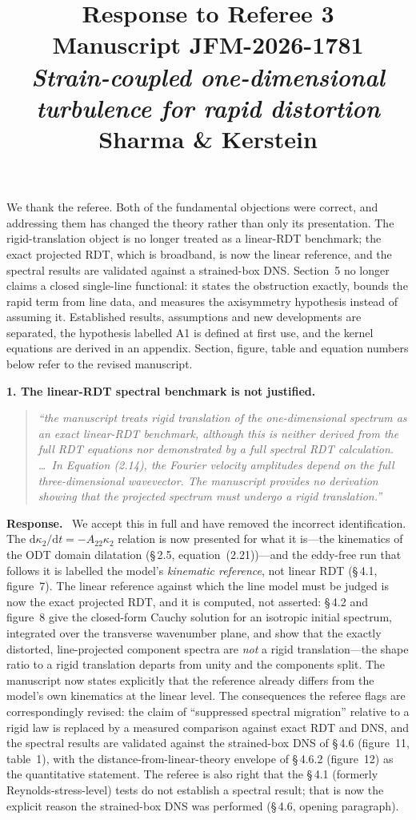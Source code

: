 \documentclass[11pt]{article}
\title{Response to Referee 3\\[2pt]
\large Manuscript JFM-2026-1781\\
\emph{Strain-coupled one-dimensional turbulence for rapid distortion}\\
Sharma \& Kerstein}
\date{}
\newenvironment{refcomment}%
  {\begin{quote}\color{commentgray}\itshape}%
  {\end{quote}}
\newcommand{\response}{\medskip\noindent\textbf{Response.}\ }
\newcommand{\point}[1]{\bigskip\noindent\textbf{#1}}
\begin{document}
\maketitle

We thank the referee. Both of the fundamental objections were correct, and
addressing them has changed the theory rather than only its presentation.
The rigid-translation object is no longer treated as a linear-RDT
benchmark; the exact projected RDT, which is broadband, is now the linear
reference, and the spectral results are validated against a strained-box
DNS. Section~5 no longer claims a closed single-line functional: it states
the obstruction exactly, bounds the rapid term from line data, and measures
the axisymmetry hypothesis instead of assuming it. Established results,
assumptions and new developments are separated, the hypothesis labelled A1
is defined at first use, and the kernel equations are derived in an
appendix. Section, figure, table and equation numbers below refer to the
revised manuscript.

\point{1. The linear-RDT spectral benchmark is not justified.}
\begin{refcomment}
``the manuscript treats rigid translation of the one-dimensional spectrum
as an exact linear-RDT benchmark, although this is neither derived from the
full RDT equations nor demonstrated by a full spectral RDT calculation.
\ldots\ In Equation (2.14), the Fourier velocity amplitudes depend on the
full three-dimensional wavevector. The manuscript provides no derivation
showing that the projected spectrum must undergo a rigid translation.''
\end{refcomment}

\response
We accept this in full and have removed the incorrect identification. The
$\mathrm{d}\kappa_2/\mathrm{d}t=-A_{22}\kappa_2$ relation is now presented
for what it is---the kinematics of the ODT domain dilatation
(\S\,2.5, equation~(2.21))---and the eddy-free run that follows it is
labelled the model's \emph{kinematic reference}, not linear RDT
(\S\,4.1, figure~7). The linear reference against which the line model must
be judged is now the exact projected RDT, and it is computed, not asserted:
\S\,4.2 and figure~8 give the closed-form Cauchy solution for an isotropic
initial spectrum, integrated over the transverse wavenumber plane, and show
that the exactly distorted, line-projected component spectra are
\emph{not} a rigid translation---the shape ratio to a rigid translation
departs from unity and the components split. The manuscript now states
explicitly that the reference already differs from the model's own
kinematics at the linear level. The consequences the referee flags are
correspondingly revised: the claim of ``suppressed spectral migration''
relative to a rigid law is replaced by a measured comparison against exact
RDT and DNS, and the spectral results are validated against the
strained-box DNS of \S\,4.6 (figure~11, table~1), with the
distance-from-linear-theory envelope of \S\,4.6.2 (figure~12) as the
quantitative statement. The referee is also right that the \S\,4.1
(formerly Reynolds-stress-level) tests do not establish a spectral result;
that is now the explicit reason the strained-box DNS was performed
(\S\,4.6, opening paragraph).
\end{document}

